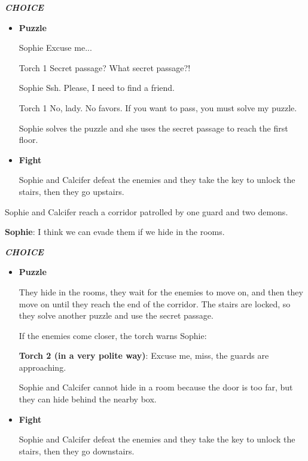 \textit{\textbf{CHOICE}}
\begin{itemize}
  \item \textbf{Puzzle}
  
\begin{screenplay}

\begin{dialogue}{Sophie}
Excuse me...
\end{dialogue}

\begin{dialogue}{Torch 1}
Secret passage? What secret passage?!
\end{dialogue}

\begin{dialogue}{Sophie}
Ssh. Please, I need to find a friend.
\end{dialogue}

\begin{dialogue}[determined]{Torch 1}
No, lady. No favors. If you want to pass, you must solve my puzzle.
\end{dialogue}

\end{screenplay}
\vspace{1em}

    Sophie solves the puzzle and she uses the secret passage to reach the first floor.

  \item \textbf{Fight}
  
  Sophie and Calcifer defeat the enemies and they take the key to unlock the stairs, then they go upstairs.
\end{itemize}


Sophie and Calcifer reach a corridor patrolled by one guard and two demons.

\textbf{Sophie}: I think we can evade them if we hide in the rooms.

\textit{\textbf{CHOICE}}
\begin{itemize}
  \item \textbf{Puzzle}
  
  They hide in the rooms, they wait for the enemies to move on, and then they move on until they reach the end of the corridor. The stairs are locked, so they solve another puzzle and use the secret passage.
  
  If the enemies come closer, the torch warns Sophie:
  
  \textbf{Torch 2 (in a very polite way)}: Excuse me, miss, the guards are approaching.
  
  Sophie and Calcifer cannot hide in a room because the door is too far, but they can hide behind the nearby box.

  \item \textbf{Fight}
  
  Sophie and Calcifer defeat the enemies and they take the key to unlock the stairs, then they go downstairs.
\end{itemize}

